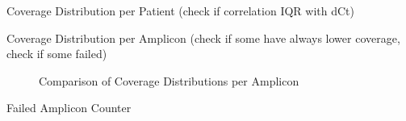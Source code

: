 Coverage Distribution per Patient (check if correlation IQR with dCt)

Coverage Distribution per Amplicon (check if some have always lower coverage, check if some failed)
\begin{figure}[!tbp]
  \centering
  \hfill
  \caption{Comparison of Coverage Distributions per Amplicon}
\end{figure}




Failed Amplicon Counter

